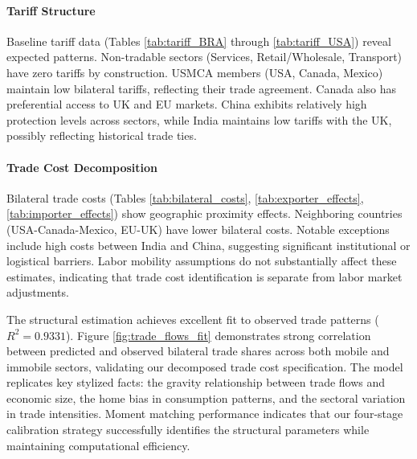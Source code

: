 \paragraph{Tariff Structure} Baseline tariff data (Tables \ref{tab:tariff_BRA} through \ref{tab:tariff_USA}) reveal expected patterns. Non-tradable sectors (Services, Retail/Wholesale, Transport) have zero tariffs by construction. USMCA members (USA, Canada, Mexico) maintain low bilateral tariffs, reflecting their trade agreement. Canada also has preferential access to UK and EU markets. China exhibits relatively high protection levels across sectors, while India maintains low tariffs with the UK, possibly reflecting historical trade ties.

\paragraph{Trade Cost Decomposition} Bilateral trade costs (Tables \ref{tab:bilateral_costs}, \ref{tab:exporter_effects}, \ref{tab:importer_effects}) show geographic proximity effects. Neighboring countries (USA-Canada-Mexico, EU-UK) have lower bilateral costs. Notable exceptions include high costs between India and China, suggesting significant institutional or logistical barriers. Labor mobility assumptions do not substantially affect these estimates, indicating that trade cost identification is separate from labor market adjustments.

The structural estimation achieves excellent fit to observed trade patterns ($R^2 = 0.9331$). Figure \ref{fig:trade_flows_fit} demonstrates strong correlation between predicted and observed bilateral trade shares across both mobile and immobile sectors, validating our decomposed trade cost specification. The model replicates key stylized facts: the gravity relationship between trade flows and economic size, the home bias in consumption patterns, and the sectoral variation in trade intensities. Moment matching performance indicates that our four-stage calibration strategy successfully identifies the structural parameters while maintaining computational efficiency.

